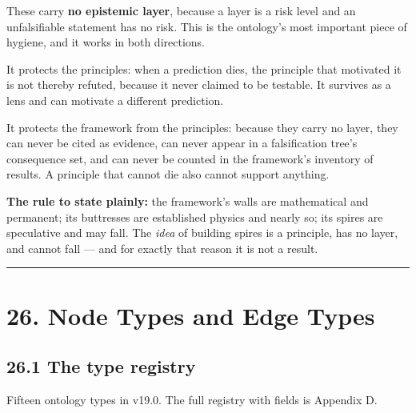 \documentclass[
  11pt]{report}
\begin{document}
These carry \textbf{no epistemic layer}, because a layer is a risk level
and an unfalsifiable statement has no risk. This is the ontology's most
important piece of hygiene, and it works in both directions.

It protects the principles: when a prediction dies, the principle that
motivated it is not thereby refuted, because it never claimed to be
testable. It survives as a lens and can motivate a different prediction.

It protects the framework from the principles: because they carry no
layer, they can never be cited as evidence, can never appear in a
falsification tree's consequence set, and can never be counted in the
framework's inventory of results. A principle that cannot die also
cannot support anything.

\textbf{The rule to state plainly:} the framework's walls are
mathematical and permanent; its buttresses are established physics and
nearly so; its spires are speculative and may fall. The \emph{idea} of
building spires is a principle, has no layer, and cannot fall --- and
for exactly that reason it is not a result.

\begin{center}\rule{0.5\linewidth}{0.5pt}\end{center}

\hypertarget{node-types-and-edge-types}{%
\chapter{26. Node Types and Edge
Types}\label{node-types-and-edge-types}}

\hypertarget{the-type-registry}{%
\section{26.1 The type registry}\label{the-type-registry}}

Fifteen ontology types in v19.0. The full registry with fields is
Appendix D.
\end{document}
